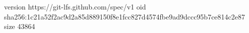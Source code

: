version https://git-lfs.github.com/spec/v1
oid sha256:1c21a52f2ac9d2a85d889150f8e1fcc827d4574fbe9ad9dccc95b7ce814c2e87
size 43864

